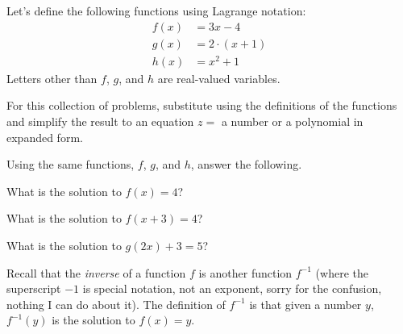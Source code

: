
Let's define the following functions using Lagrange notation:
\begin{equation*}
 \begin{split}
   f(x) &= 3x - 4
   \\
   g(x) &= 2\cdot(x + 1)
   \\
   h(x) &= x^2 + 1
 \end{split}
\end{equation*}
Letters other than $f$, $g$, and $h$ are real-valued variables.

For this collection of problems, substitute using the definitions of the functions and simplify the result to an equation $z = $ a number or a polynomial in expanded form.

\begin{multicols}{2}
 \begin{ProblemSet}[pencil space=2in]
 \end{ProblemSet}
\end{multicols}

\newpage

Using the same functions, $f$, $g$, and $h$, answer the following.

\begin{ProblemSet}[pencil space=2.75in]
 \begin{Problem}
  What is the solution to $f(x) = 4$?
 \end{Problem}
 \begin{Problem}
  What is the solution to $f(x + 3) = 4$?
 \end{Problem}
 \begin{Problem}
  What is the solution to $g(2x) + 3 = 5$?
 \end{Problem}
\end{ProblemSet}

\newpage

Recall that the \emph{inverse} of a function $f$ is another function $f^{-1}$ (where the superscript $-1$ is special notation, not an exponent, sorry for the confusion, nothing I can do about it).
The definition of $f^{-1}$ is that given a number $y$, $f^{-1}(y)$ is the solution to $f(x) = y$.

